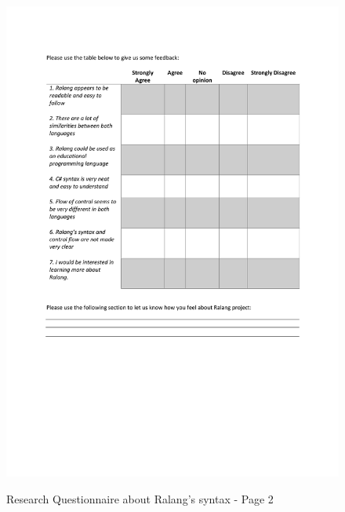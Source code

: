 \documentclass[a4paper]{article}
\begin{document}
\begin{appendices}
\begin{figure}[h!]
{			\includegraphics[width=\linewidth]{ResearchQuestionnaire2.pdf}}
		\caption{Research Questionnaire about Ralang's syntax - Page 2}
	\end{figure}
	\newpage

\end{appendices}
\end{document}
